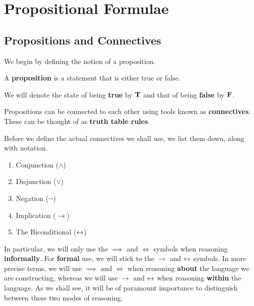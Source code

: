 \section{Propositional Formulae}

\subsection{Propositions and Connectives}

We begin by defining the notion of a proposition.

\begin{boxdefinition}[Proposition]
    A \textbf{proposition} is a statement that is either true or false.
\end{boxdefinition}

\begin{boxconvention}
    We will denote the state of being \textbf{true} by $\mathbf{T}$ and that of being \textbf{false} by $\mathbf{F}$.
\end{boxconvention}

Propositions can be connected to each other using tools known as \textbf{connectives}. These can be thought of as \textbf{truth table rules}.

\begin{boxconvention}
    Before we define the actual connectives we shall use, we list them down, along with notation.
    \begin{enumerate}[noitemsep]
        \item Conjunction ($\land$)
        \item Disjunction ($\lor$)
        \item Negation ($\neg$)
        \item Implication ($\to$)
        \item The Biconditional ($\leftrightarrow$)
    \end{enumerate}
    In particular, we will only use the $\implies$ and $\iff$ symbols when reasoning \textbf{informally}. For \textbf{formal} use, we will stick to the $\to$ and $\leftrightarrow$ symbols. In more precise terms, we will use $\implies$ and $\iff$ when reasoning \textbf{about} the language we are constructing, whereas we will use $\to$ and $\leftrightarrow$ when reasoning \textbf{within} the language. As we shall see, it will be of paramount importance to distinguish between these two modes of reasoning.
\end{boxconvention}

